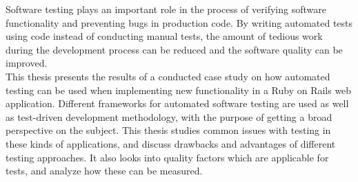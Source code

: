 Software testing plays an important role in the process of verifying
software functionality and preventing bugs in production code. By
writing automated tests using code instead of conducting manual tests,
the amount of tedious work during the development process can be reduced
and the software quality can be improved.\\

This thesis presents the results of a conducted case study on how
automated testing can be used when implementing new functionality in a
Ruby on Rails web application. Different frameworks for automated
software testing are used as well as test-driven development
methodology, with the purpose of getting a broad perspective on the
subject. This thesis studies common issues with testing in these kinds of
applications, and discuss drawbacks and advantages of different testing
approaches. It also looks into quality factors which are applicable for
tests, and analyze how these can be measured.\\
